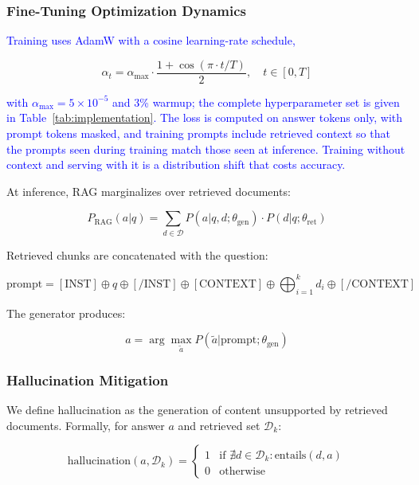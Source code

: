 \documentclass{article}
\newcommand{\revised}[1]{\textcolor{blue}{#1}}
\newcommand{\revised}[1]{#1}
\begin{document}
\subsubsection{Fine-Tuning Optimization Dynamics}

\revised{Training uses AdamW with a cosine learning-rate schedule,}

\begin{equation}
\alpha_t = \alpha_{\text{max}} \cdot \frac{1 + \cos(\pi \cdot t/T)}{2}, \quad t \in [0, T]
\end{equation}

\revised{with $\alpha_{\text{max}} = 5 \times 10^{-5}$ and 3\% warmup; the complete
hyperparameter set is given in Table~\ref{tab:implementation}. The loss is computed on
answer tokens only, with prompt tokens masked, and training prompts include retrieved
context so that the prompts seen during training match those seen at inference.
Training without context and serving with it is a distribution shift that costs
accuracy.}

At inference, RAG marginalizes over retrieved documents:

\begin{equation}
P_{\text{RAG}}(a|q) = \sum_{d \in \mathcal{D}} P(a|q, d; \theta_{\text{gen}}) \cdot P(d|q; \theta_{\text{ret}})
\end{equation}

Retrieved chunks are concatenated with the question:

\begin{equation}
\text{prompt} = [\text{INST}] \oplus q \oplus [\text{/INST}] \oplus [\text{CONTEXT}] \oplus \bigoplus_{i=1}^{k} d_i \oplus [\text{/CONTEXT}]
\end{equation}

The generator produces:

\begin{equation}
a = \arg\max_{\tilde{a}} P(\tilde{a} | \text{prompt}; \theta_{\text{gen}})
\end{equation}

\subsubsection{Hallucination Mitigation}
\label{sec:hallucination-method}

We define hallucination as the generation of content unsupported by retrieved
documents. Formally, for answer $a$ and retrieved set $\mathcal{D}_k$:

\begin{equation}
\text{hallucination}(a, \mathcal{D}_k) = \begin{cases}
1 & \text{if } \nexists d \in \mathcal{D}_k : \text{entails}(d, a) \\
0 & \text{otherwise}
\end{cases}
\end{equation}
\end{document}
